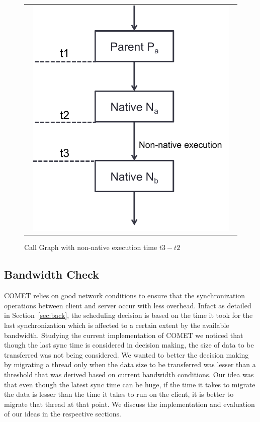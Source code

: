 \begin{figure} [thf*]
\centering
\begin{tabular}{c}
\begin{minipage}[b]{0.5\textwidth}
\includegraphics[width=0.95\textwidth]{figs/native_native.pdf}
\end{minipage}
\end{tabular}
\caption{Call Graph with non-native execution time $t3-t2$}
\label{fig:native_native}
\end{figure}

\subsection{Bandwidth Check}
COMET relies on good network conditions to ensure that the synchronization operations between client and server occur with less overhead. Infact as detailed in Section~\ref{sec:back}, the scheduling decision is based on the time it took for the last synchronization which is affected to a certain extent by the available bandwidth. Studying the current implementation of COMET we noticed that though the last sync time is considered in decision making, the size of data to be transferred was not being considered. We wanted to better the decision making by migrating a thread only when the data size to be transferred was lesser than a threshold that was derived based on current bandwidth conditions. Our idea was that even though the latest sync time can be huge, if the time it takes to migrate the data is lesser than the time it takes to run on the client, it is better to migrate that thread at that point. We discuss the implementation and evaluation of our ideas in the respective sections.
